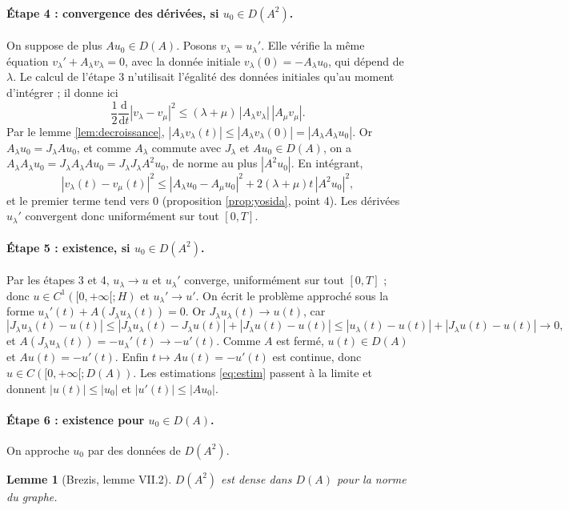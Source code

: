 \documentclass[11pt,a4paper]{article}
\theoremstyle{plain}
\newtheorem{lemme}[theoreme]{Lemme}
\theoremstyle{definition}
\theoremstyle{remark}
\newcommand{\dt}{\frac{\mathrm{d}}{\mathrm{d}t}}
\begin{document}
\paragraph{Étape 4 : convergence des dérivées, si $u_0\in D(A^2)$.} On suppose de plus $Au_0\in D(A)$. Posons $v_\lambda=u_\lambda'$. Elle vérifie la même équation $v_\lambda'+A_\lambda v_\lambda=0$, avec la donnée initiale $v_\lambda(0)=-A_\lambda u_0$, qui dépend de $\lambda$. Le calcul de l'étape 3 n'utilisait l'égalité des données initiales qu'au moment d'intégrer ; il donne ici
\[
  \frac12\dt|v_\lambda-v_\mu|^2\leq(\lambda+\mu)\,|A_\lambda v_\lambda|\,|A_\mu v_\mu| .
\]
Par le lemme \ref{lem:decroissance}, $|A_\lambda v_\lambda(t)|\leq|A_\lambda v_\lambda(0)|=|A_\lambda A_\lambda u_0|$. Or $A_\lambda u_0=J_\lambda Au_0$, et comme $A_\lambda$ commute avec $J_\lambda$ et $Au_0\in D(A)$, on a $A_\lambda A_\lambda u_0=J_\lambda A_\lambda Au_0=J_\lambda J_\lambda A^2u_0$, de norme au plus $|A^2u_0|$. En intégrant,
\[
  |v_\lambda(t)-v_\mu(t)|^2\leq|A_\lambda u_0-A_\mu u_0|^2+2(\lambda+\mu)t\,|A^2u_0|^2 ,
\]
et le premier terme tend vers $0$ (proposition \ref{prop:yosida}, point 4). Les dérivées $u_\lambda'$ convergent donc uniformément sur tout $[0,T]$.

\paragraph{Étape 5 : existence, si $u_0\in D(A^2)$.} Par les étapes 3 et 4, $u_\lambda\to u$ et $u_\lambda'$ converge, uniformément sur tout $[0,T]$ ; donc $u\in C^1([0,+\infty[;H)$ et $u_\lambda'\to u'$. On écrit le problème approché sous la forme $u_\lambda'(t)+A(J_\lambda u_\lambda(t))=0$. Or $J_\lambda u_\lambda(t)\to u(t)$, car
\[
  |J_\lambda u_\lambda(t)-u(t)|\leq|J_\lambda u_\lambda(t)-J_\lambda u(t)|+|J_\lambda u(t)-u(t)|\leq|u_\lambda(t)-u(t)|+|J_\lambda u(t)-u(t)|\longrightarrow0 ,
\]
et $A(J_\lambda u_\lambda(t))=-u_\lambda'(t)\to-u'(t)$. Comme $A$ est fermé, $u(t)\in D(A)$ et $Au(t)=-u'(t)$. Enfin $t\mapsto Au(t)=-u'(t)$ est continue, donc $u\in C([0,+\infty[;D(A))$. Les estimations \eqref{eq:estim} passent à la limite et donnent $|u(t)|\leq|u_0|$ et $|u'(t)|\leq|Au_0|$.

\paragraph{Étape 6 : existence pour $u_0\in D(A)$.} On approche $u_0$ par des données de $D(A^2)$.

\begin{lemme}[Brezis, lemme VII.2]\label{lem:densite}
$D(A^2)$ est dense dans $D(A)$ pour la norme du graphe.
\end{lemme}
\end{document}
